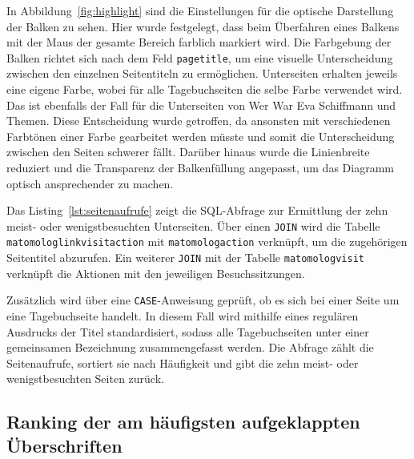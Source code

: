 In Abbildung~\ref{fig:highlight} sind die Einstellungen für die optische Darstellung der Balken zu sehen. Hier wurde festgelegt, dass beim Überfahren eines Balkens mit der Maus der gesamte Bereich farblich markiert wird. Die Farbgebung der Balken richtet sich nach dem Feld \texttt{page\textunderscore title}, um eine visuelle Unterscheidung zwischen den einzelnen Seitentiteln zu ermöglichen. Unterseiten erhalten jeweils eine eigene Farbe, wobei für alle Tagebuchseiten die selbe Farbe verwendet wird. Das ist ebenfalls der Fall für die Unterseiten von \glqq Wer War Eva Schiffmann\grqq{} und \glqq Themen\grqq{}. Diese Entscheidung wurde getroffen, da ansonsten mit verschiedenen Farbtönen einer Farbe gearbeitet werden müsste und somit die Unterscheidung zwischen den Seiten schwerer fällt. Darüber hinaus wurde die Linienbreite reduziert und die Transparenz der Balkenfüllung angepasst, um das Diagramm optisch ansprechender zu machen.

\begin{figure}[H]
    \centering
    \begin{minipage}{\textwidth}
        
    \end{minipage}
\end{figure}

Das Listing~\ref{lst:seitenaufrufe} zeigt die SQL-Abfrage zur Ermittlung der zehn meist- oder wenigstbesuchten Unterseiten. Über einen \texttt{JOIN} wird die Tabelle \texttt{matomo\textunderscore log\textunderscore link\textunderscore visit\textunderscore action} mit \texttt{matomo\textunderscore log\textunderscore action} verknüpft, um die zugehörigen Seitentitel abzurufen. Ein weiterer \texttt{JOIN} mit der Tabelle \texttt{matomo\textunderscore log\textunderscore visit} verknüpft die Aktionen mit den jeweiligen Besuchssitzungen.

Zusätzlich wird über eine \texttt{CASE}-Anweisung geprüft, ob es sich bei einer Seite um eine Tagebuchseite handelt. In diesem Fall wird mithilfe eines regulären Ausdrucks der Titel standardisiert, sodass alle Tagebuchseiten unter einer gemeinsamen Bezeichnung zusammengefasst werden. Die Abfrage zählt die Seitenaufrufe, sortiert sie nach Häufigkeit und gibt die zehn meist- oder wenigstbesuchten Seiten zurück.

\subsection{Ranking der am häufigsten aufgeklappten Überschriften}

